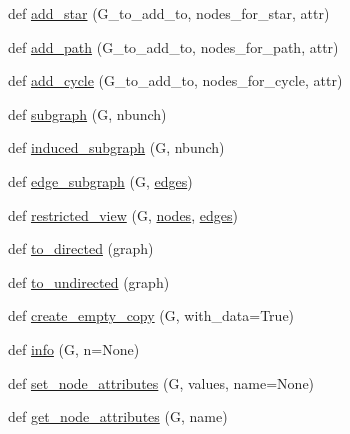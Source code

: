 \begin{DoxyCompactItemize}
def \hyperlink{namespacenetworkx_1_1classes_1_1function_a3ef5d5719b3cee2143f426efb16166af}{add\+\_\+star} (G\+\_\+to\+\_\+add\+\_\+to, nodes\+\_\+for\+\_\+star, attr)
\item 
def \hyperlink{namespacenetworkx_1_1classes_1_1function_a272ff2af873850562af525145f897dda}{add\+\_\+path} (G\+\_\+to\+\_\+add\+\_\+to, nodes\+\_\+for\+\_\+path, attr)
\item 
def \hyperlink{namespacenetworkx_1_1classes_1_1function_aea8b85f51c5079f3c36d1e2fcdd28fec}{add\+\_\+cycle} (G\+\_\+to\+\_\+add\+\_\+to, nodes\+\_\+for\+\_\+cycle, attr)
\item 
def \hyperlink{namespacenetworkx_1_1classes_1_1function_acfa7d5122eef21ede5dee1c2f8521ee5}{subgraph} (G, nbunch)
\item 
def \hyperlink{namespacenetworkx_1_1classes_1_1function_a45a2ad0f85ad7d26c35b59a641025c3c}{induced\+\_\+subgraph} (G, nbunch)
\item 
def \hyperlink{namespacenetworkx_1_1classes_1_1function_a39d2d99f08dc6f638279d48ca07679c9}{edge\+\_\+subgraph} (G, \hyperlink{namespacenetworkx_1_1classes_1_1function_ab909d446533d66c2c860fd617b12baba}{edges})
\item 
def \hyperlink{namespacenetworkx_1_1classes_1_1function_a9cfec12fd521d462be920924dd5953f4}{restricted\+\_\+view} (G, \hyperlink{namespacenetworkx_1_1classes_1_1function_a13ec9e314635ecbb194fe675b544d3e5}{nodes}, \hyperlink{namespacenetworkx_1_1classes_1_1function_ab909d446533d66c2c860fd617b12baba}{edges})
\item 
def \hyperlink{namespacenetworkx_1_1classes_1_1function_aa5e5092cd7da6e6ed1c61b46c51f5e09}{to\+\_\+directed} (graph)
\item 
def \hyperlink{namespacenetworkx_1_1classes_1_1function_a278629fd7422427c446489efd50f2759}{to\+\_\+undirected} (graph)
\item 
def \hyperlink{namespacenetworkx_1_1classes_1_1function_a565df0c79563c4cde9f996730f69b6d8}{create\+\_\+empty\+\_\+copy} (G, with\+\_\+data=True)
\item 
def \hyperlink{namespacenetworkx_1_1classes_1_1function_ad844158261f251a2a9706c3f2ac06d0c}{info} (G, n=None)
\item 
def \hyperlink{namespacenetworkx_1_1classes_1_1function_acfa227e0002def739138e08480a98799}{set\+\_\+node\+\_\+attributes} (G, values, name=None)
\item 
def \hyperlink{namespacenetworkx_1_1classes_1_1function_a084c24285aa0773cefca0807c62d2ee6}{get\+\_\+node\+\_\+attributes} (G, name)
\item 

\end{DoxyCompactItemize}
